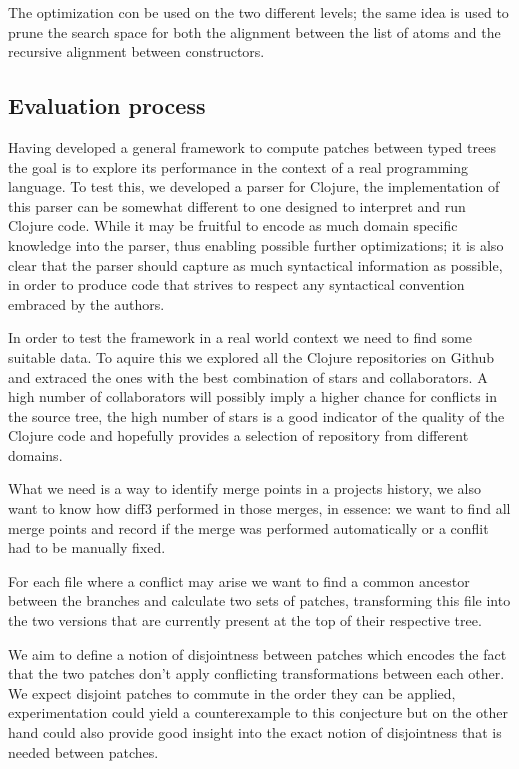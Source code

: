 \documentclass[11pt]{article}
\begin{document}
The optimization con be used on the two different levels; the same idea is used to prune the search space 
for both the alignment between the list of atoms and the recursive alignment between constructors.


\subsection{Evaluation process}

Having developed a general framework to compute patches between typed trees the 
goal is to explore its performance in the context of a real programming 
language.
To test this, we developed a parser for Clojure, the implementation of this parser can be somewhat 
different to one designed to interpret and run Clojure code. While it may 
be fruitful to encode as much domain specific knowledge into the parser, thus 
enabling possible further optimizations; it is also clear that the parser should 
capture as much syntactical information as possible, in order to produce code 
that strives to respect any syntactical convention embraced by the authors.

In order to test the framework in a real world context we need to find some suitable data. To aquire this 
we explored all the Clojure repositories on Github and extraced the ones with the best combination of 
stars and collaborators. A high number of collaborators will possibly imply a higher chance for conflicts in
the source tree, the high number of stars is a good indicator of the quality of 
the Clojure code and hopefully provides a selection of repository from different 
domains.

What we need is a way to identify merge points in a projects history, we also 
want to know how diff3 performed in those merges, in essence: we want to find all 
merge points and record if the merge was performed automatically or a conflit 
had to be manually fixed.

For each file where a conflict may arise we want to find a common ancestor 
between the branches and calculate two sets of patches, transforming this file 
into the two versions that are currently present at the top of their respective 
tree. 

We aim to define a notion of disjointness between patches which 
encodes the fact that the two patches don't apply conflicting transformations 
between each other. We expect disjoint patches to commute in the order they can 
be applied, experimentation could yield a counterexample to this conjecture but 
on the other hand could also provide good insight into the exact notion of 
disjointness that is needed between patches.
\end{document}
